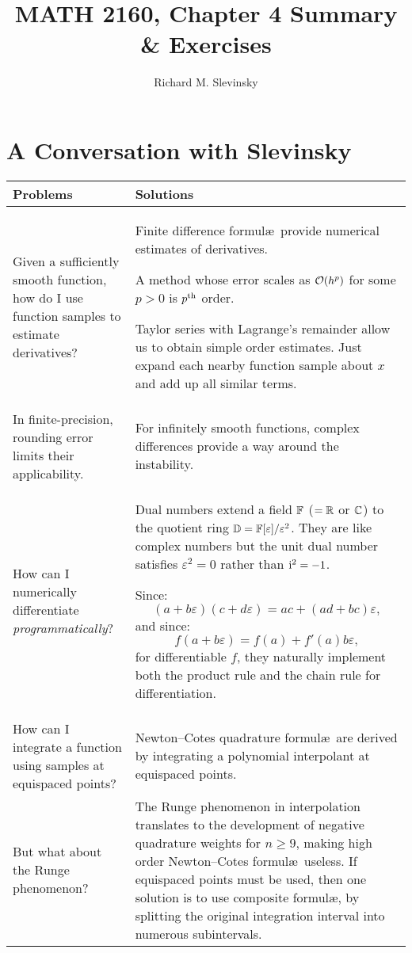 \documentclass[11pt,letterpaper]{article}
\begin{document}
\title{MATH 2160, Chapter 4 Summary \& Exercises}
\author{Richard M. Slevinsky}
\date{}
\maketitle

\section*{A Conversation with Slevinsky}

\begin{longtable}{p{}|p{}}
\hline
Problems & Solutions\\
\hline
Given a sufficiently smooth function, how do I use function samples to estimate derivatives? & Finite difference formul\ae~provide numerical estimates of derivatives.

A method whose error scales as $\mathcal{O}(h^p)$ for some $p>0$ is $p^{\rm th}$ order.

Taylor series with Lagrange's remainder allow us to obtain simple order estimates. Just expand each nearby function sample about $x$ and add up all similar terms.\\

In finite-precision, rounding error limits their applicability. & For infinitely smooth functions, complex differences provide a way around the instability.\\

How can I numerically differentiate {\em programmatically}? & Dual numbers extend a field $\mathbb{F}$ ($=\mathbb{R}$ or $\mathbb{C}$) to the quotient ring $\mathbb{D} = \mathbb{F}[\varepsilon]/\varepsilon^2$. They are like complex numbers but the unit dual number satisfies $\varepsilon^2=0$ rather than ${\rm i}^2=-1$.

Since:
$$(a+b\varepsilon)(c+d\varepsilon) = ac + (ad+bc)\varepsilon,$$
and since:
$$f(a+b\varepsilon) = f(a) + f'(a)b\varepsilon,$$
for differentiable $f$, they naturally implement both the product rule and the chain rule for differentiation.\\

How can I integrate a function using samples at equispaced points? & Newton--Cotes quadrature formul\ae~are derived by integrating a polynomial interpolant at equispaced points.\\

But what about the Runge phenomenon? & The Runge phenomenon in interpolation translates to the development of negative quadrature weights for $n\ge9$, making high order Newton--Cotes formul\ae~useless. If equispaced points must be used, then one solution is to use composite formul\ae, by splitting the original integration interval into numerous subintervals.\\


\end{longtable}
\end{document}
